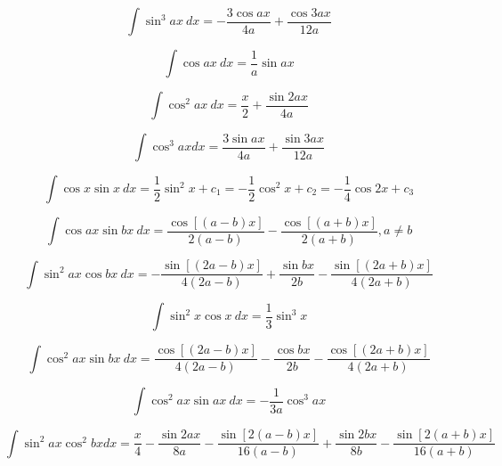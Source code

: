 \begin{equation*}
\int \sin^3 ax \ dx = -\frac{3 \cos ax}{4a} + \frac{\cos 3ax} {12a} 
\end{equation*}

\begin{equation*}
\int \cos ax\ dx= \frac{1}{a} \sin ax 
\end{equation*}

\begin{equation*}
\int \cos^2 ax\ dx = \frac{x}{2}+\frac{ \sin 2ax}{4a} 
\end{equation*}

\begin{equation*}
\int \cos^3 ax dx = \frac{3 \sin ax}{4a}+\frac{ \sin 3ax}{12a} 
\end{equation*}

\begin{equation*}\label{eq:veky}
\int \cos x \sin x\ dx = \frac{1}{2}\sin^2 x + c_1 = -\frac{1}{2} \cos^2x + c_2 = -\frac{1}{4} \cos 2x + c_3
\end{equation*}

\begin{equation*}
\int \cos ax \sin bx\ dx = \frac{\cos[(a-b) x]}{2(a-b)} -
\frac{\cos[(a+b)x]}{2(a+b)} , a\ne b
\end{equation*}

\begin{equation*}
\int \sin^2 ax \cos bx\ dx = 
-\frac{\sin[(2a-b)x]}{4(2a-b)} 
+ \frac{\sin bx}{2b} 
- \frac{\sin[(2a+b)x]}{4(2a+b)}
\end{equation*}

\begin{equation*}
\int \sin^2 x \cos x\ dx = \frac{1}{3} \sin^3 x
\end{equation*}

\begin{equation*}
\int \cos^2 ax \sin bx\ dx = \frac{\cos[(2a-b)x]}{4(2a-b)} 
- \frac{\cos bx}{2b}
- \frac{\cos[(2a+b)x]}{4(2a+b)}
\end{equation*}

\begin{equation*}
\int \cos^2 ax \sin ax\ dx = -\frac{1}{3a}\cos^3{ax} 
\end{equation*}

\begin{equation*}
\int \sin^2 ax \cos^2 bx dx = \frac{x}{4}
-\frac{\sin 2ax}{8a}-
\frac{\sin[2(a-b)x]}{16(a-b)}
+\frac{\sin 2bx}{8b}-
\frac{\sin[2(a+b)x]}{16(a+b)}
\end{equation*}

